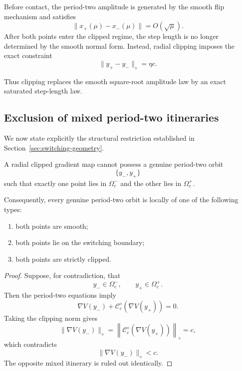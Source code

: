 \begin{remark}
\label{rem:amplitude-saturation-main}
Before contact, the period-two amplitude is generated by the smooth
flip mechanism and satisfies
\[
\|x_+(\mu)-x_-(\mu)\|
=
O(\sqrt{\mu}).
\]
After both points enter the clipped regime, the step length is no
longer determined by the smooth normal form.  Instead, radial clipping
imposes the exact constraint
\[
\|y_+-y_-\|_\diamond
=
\eta c.
\]

Thus clipping replaces the smooth square-root amplitude law by an
exact saturated step-length law.
\end{remark}

\subsection{Exclusion of mixed period-two itineraries}
\label{subsec:no-mixed-two-cycle-main}

We now state explicitly the structural restriction established in
Section~\ref{sec:switching-geometry}.

\begin{proposition}
\label{prop:no-mixed-two-cycle-main}
A radial clipped gradient map cannot possess a genuine period-two
orbit
\[
\{y_-,y_+\}
\]
such that exactly one point lies in $\Omega_c^-$ and the other lies
in $\Omega_c^+$.

Consequently, every genuine period-two orbit is locally of one of the
following types:
\begin{enumerate}[label=\textnormal{(\roman*)}]
\item both points are smooth;
\item both points lie on the switching boundary;
\item both points are strictly clipped.
\end{enumerate}
\end{proposition}

\begin{proof}
Suppose, for contradiction, that
\[
y_-\in\Omega_c^-,
\qquad
y_+\in\Omega_c^+.
\]
Then the period-two equations imply
\[
\nabla V(y_-)
+
\mathcal C_c^\diamond(\nabla V(y_+))
=
0.
\]
Taking the clipping norm gives
\[
\|\nabla V(y_-)\|_\diamond
=
\left\|
\mathcal C_c^\diamond(\nabla V(y_+))
\right\|_\diamond
=
c,
\]
which contradicts
\[
\|\nabla V(y_-)\|_\diamond<c.
\]
The opposite mixed itinerary is ruled out identically.
\end{proof}

